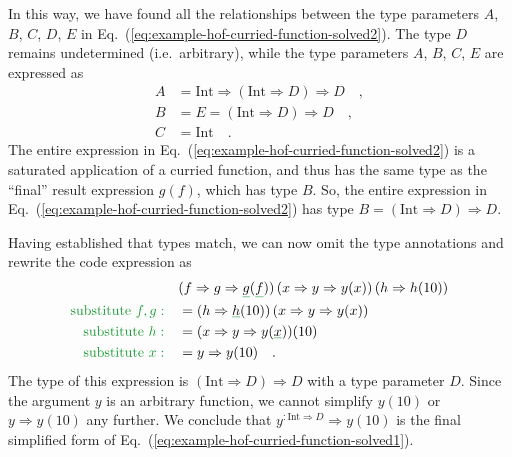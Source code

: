 In this way, we have found all the relationships between the type
parameters $A$, $B$, $C$, $D$, $E$ in Eq.~(\ref{eq:example-hof-curried-function-solved2}).
The type $D$ remains undetermined (i.e.~arbitrary), while the type
parameters $A$, $B$, $C$, $E$ are expressed as
\begin{align}
A & =\text{Int}\Rightarrow\left(\text{Int}\Rightarrow D\right)\Rightarrow D\quad,\label{eq:example-hof-curried-solved3}\\
B & =E=\left(\text{Int}\Rightarrow D\right)\Rightarrow D\quad,\label{eq:example-hof-curried-solved4}\\
C & =\text{Int}\quad.\nonumber 
\end{align}
The entire expression in Eq.~(\ref{eq:example-hof-curried-function-solved2})
is a saturated application of a curried function, and thus has the
same type as the ``final'' result expression $g(f)$, which has
type $B$. So, the entire expression in Eq.~(\ref{eq:example-hof-curried-function-solved2})
has type $B=\left(\text{Int}\Rightarrow D\right)\Rightarrow D$.

Having established that types match, we can now omit the type annotations
and rewrite the code expression as
\begin{align*}
 & (f\Rightarrow g\Rightarrow\gunderline g(\gunderline f))\left(x\Rightarrow y\Rightarrow y(x)\right)\left(h\Rightarrow h(10)\right)\\
{\color{greenunder}\text{substitute }f,g:}\quad & =(h\Rightarrow\gunderline h(10))\left(x\Rightarrow y\Rightarrow y(x)\right)\\
{\color{greenunder}\text{substitute }h:}\quad & =(x\Rightarrow y\Rightarrow y(\gunderline x))(10)\\
{\color{greenunder}\text{substitute }x:}\quad & =y\Rightarrow y(10)\quad.
\end{align*}
The type of this expression is $\left(\text{Int}\Rightarrow D\right)\Rightarrow D$
with a type parameter $D$. Since the argument $y$ is an arbitrary
function, we cannot simplify $y(10)$ or $y\Rightarrow y(10)$ any
further. We conclude that $y^{:\text{Int}\Rightarrow D}\Rightarrow y(10)$
is the final simplified form of Eq.~(\ref{eq:example-hof-curried-function-solved1}).

